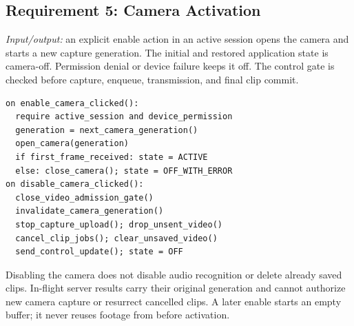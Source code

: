 \subsection{Requirement 5: Camera Activation}
\textit{Input/output:} an explicit enable action in an active session opens the camera and starts a new capture generation. The initial and restored application state is camera-off. Permission denial or device failure keeps it off. The control gate is checked before capture, enqueue, transmission, and final clip commit.
\par\smallskip\noindent\begin{minipage}{\columnwidth}
\begin{lstlisting}
on enable_camera_clicked():
  require active_session and device_permission
  generation = next_camera_generation()
  open_camera(generation)
  if first_frame_received: state = ACTIVE
  else: close_camera(); state = OFF_WITH_ERROR
on disable_camera_clicked():
  close_video_admission_gate()
  invalidate_camera_generation()
  stop_capture_upload(); drop_unsent_video()
  cancel_clip_jobs(); clear_unsaved_video()
  send_control_update(); state = OFF
\end{lstlisting}
\end{minipage}\par
Disabling the camera does not disable audio recognition or delete already saved clips. In-flight server results carry their original generation and cannot authorize new camera capture or resurrect cancelled clips. A later enable starts an empty buffer; it never reuses footage from before activation.

